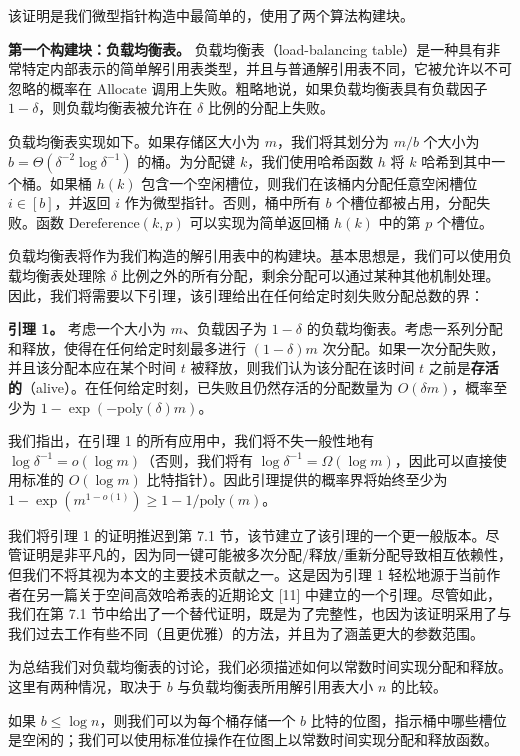 \documentclass[12pt,a4paper]{ctexart}
\theoremstyle{remark}
\begin{document}
该证明是我们微型指针构造中最简单的，使用了两个算法构建块。

\textbf{第一个构建块：负载均衡表。} 负载均衡表（load-balancing table）是一种具有非常特定内部表示的简单解引用表类型，并且与普通解引用表不同，它被允许以不可忽略的概率在 $\text{Allocate}$ 调用上失败。粗略地说，如果负载均衡表具有负载因子 $1-\delta$，则负载均衡表被允许在 $\delta$ 比例的分配上失败。

负载均衡表实现如下。如果存储区大小为 $m$，我们将其划分为 $m/b$ 个大小为 $b=\Theta(\delta^{-2}\log\delta^{-1})$ 的桶。为分配键 $k$，我们使用哈希函数 $h$ 将 $k$ 哈希到其中一个桶。如果桶 $h(k)$ 包含一个空闲槽位，则我们在该桶内分配任意空闲槽位 $i\in[b]$，并返回 $i$ 作为微型指针。否则，桶中所有 $b$ 个槽位都被占用，分配失败。函数 $\text{Dereference}(k,p)$ 可以实现为简单返回桶 $h(k)$ 中的第 $p$ 个槽位。

负载均衡表将作为我们构造的解引用表中的构建块。基本思想是，我们可以使用负载均衡表处理除 $\delta$ 比例之外的所有分配，剩余分配可以通过某种其他机制处理。因此，我们将需要以下引理，该引理给出在任何给定时刻失败分配总数的界：

\textbf{引理 1。} 考虑一个大小为 $m$、负载因子为 $1-\delta$ 的负载均衡表。考虑一系列分配和释放，使得在任何给定时刻最多进行 $(1-\delta)m$ 次分配。如果一次分配失败，并且该分配本应在某个时间 $t$ 被释放，则我们认为该分配在该时间 $t$ 之前是\textbf{存活的}（alive）。在任何给定时刻，已失败且仍然存活的分配数量为 $O(\delta m)$，概率至少为 $1-\exp(-\text{poly}(\delta)m)$。

我们指出，在引理 1 的所有应用中，我们将不失一般性地有 $\log\delta^{-1}=o(\log m)$（否则，我们将有 $\log\delta^{-1}=\Omega(\log m)$，因此可以直接使用标准的 $O(\log m)$ 比特指针）。因此引理提供的概率界将始终至少为 $1-\exp(m^{1-o(1)})\geq 1-1/\text{poly}(m)$。

我们将引理 1 的证明推迟到第 7.1 节，该节建立了该引理的一个更一般版本。尽管证明是非平凡的，因为同一键可能被多次分配/释放/重新分配导致相互依赖性，但我们不将其视为本文的主要技术贡献之一。这是因为引理 1 轻松地源于当前作者在另一篇关于空间高效哈希表的近期论文 [11] 中建立的一个引理。尽管如此，我们在第 7.1 节中给出了一个替代证明，既是为了完整性，也因为该证明采用了与我们过去工作有些不同（且更优雅）的方法，并且为了涵盖更大的参数范围。

为总结我们对负载均衡表的讨论，我们必须描述如何以常数时间实现分配和释放。这里有两种情况，取决于 $b$ 与负载均衡表所用解引用表大小 $n$ 的比较。

如果 $b\leq\log n$，则我们可以为每个桶存储一个 $b$ 比特的位图，指示桶中哪些槽位是空闲的；我们可以使用标准位操作在位图上以常数时间实现分配和释放函数。
\end{document}
